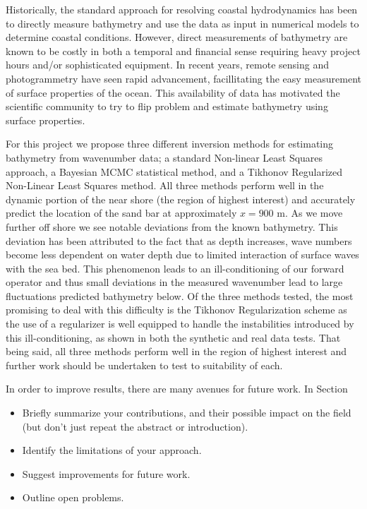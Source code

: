 Historically, the standard approach for resolving coastal hydrodynamics has been to directly measure bathymetry and use the data as input in numerical models to determine coastal conditions. However, direct measurements of bathymetry are known to be costly in both a temporal and financial sense requiring heavy project hours and/or sophisticated equipment. In recent years, remote sensing and photogrammetry have seen rapid advancement, facillitating the easy measurement of surface properties of the ocean. This availability of data has motivated the scientific community to try to flip problem and estimate bathymetry using surface properties.

For this project we propose three different inversion methods for estimating bathymetry from wavenumber data; a standard Non-linear Least Squares approach, a Bayesian MCMC statistical method, and a Tikhonov Regularized Non-Linear Least Squares method. All three methods perform well in the dynamic portion of the near shore (the region of highest interest) and accurately predict the location of the sand bar at approximately $x = 900$ m. As we move further off shore we see notable deviations from the known bathymetry. This deviation has been attributed to the fact that as depth increases, wave numbers become less dependent on water depth due to limited interaction of surface waves with the sea bed. This phenomenon leads to an ill-conditioning of our forward operator and thus small deviations in the measured wavenumber lead to large fluctuations predicted bathymetry below. Of the three methods tested, the most promising to deal with this difficulty is the Tikhonov Regularization scheme as the use of a regularizer is well equipped to handle the instabilities introduced by this ill-conditioning, as shown in both the synthetic and real data tests. That being said, all three methods perform well in the region of highest interest and further work should be undertaken to test to suitability of each.

In order to improve results, there are many avenues for future work. In Section 


\begin{itemize}
\item Briefly summarize your contributions, and their possible
impact on the field (but don't just repeat the abstract or introduction).
\item Identify the limitations of your approach.
\item Suggest improvements for future work.
\item Outline open problems.
\end{itemize}

